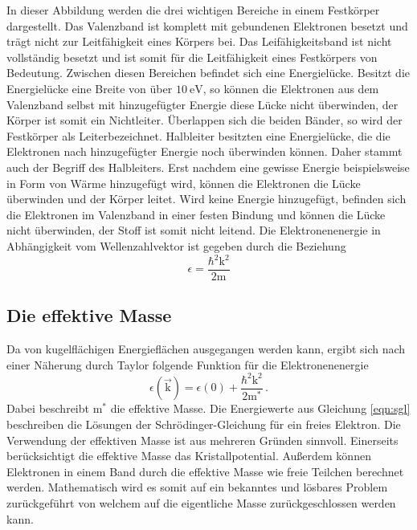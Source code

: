 In dieser Abbildung werden die drei wichtigen Bereiche in einem Festkörper
dargestellt. Das Valenzband ist komplett mit gebundenen
Elektronen besetzt und trägt nicht
zur Leitfähigkeit eines Körpers bei. Das Leifähigkeitsband ist nicht
vollständig besetzt und ist somit für die Leitfähigkeit eines Festkörpers von
Bedeutung. Zwischen diesen Bereichen befindet sich eine Energielücke. Besitzt
die Energielücke eine Breite von über $\SI{10}{\electronvolt}$, so können die
Elektronen aus dem Valenzband selbst mit hinzugefügter Energie diese Lücke nicht
überwinden, der Körper ist somit ein Nichtleiter. Überlappen sich die beiden
Bänder, so wird der Festkörper als Leiterbezeichnet. Halbleiter besitzten eine
Energielücke, die die Elektronen nach hinzugefügter Energie noch überwinden
können. Daher stammt auch der Begriff des Halbleiters. Erst nachdem eine
gewisse Energie beispielsweise in Form von Wärme hinzugefügt wird, können die
Elektronen die Lücke überwinden und der Körper leitet. Wird keine Energie
hinzugefügt, befinden sich die Elektronen im Valenzband in einer festen Bindung
und können die Lücke nicht überwinden, der Stoff ist somit nicht leitend. Die
Elektronenenergie in Abhängigkeit vom Wellenzahlvektor ist gegeben durch die
Beziehung
\begin{equation}
  \epsilon = \frac{\hbar^2 \text{k}^2}{2 \text{m}}
\end{equation}

\subsection{Die effektive Masse}
Da von kugelflächigen Energieflächen ausgegangen werden kann, ergibt sich nach
einer Näherung durch Taylor folgende Funktion für die Elektronenenergie
\begin{equation}
  \epsilon\left(\vec{\text{k}}\right) = \epsilon(0) + \frac{\hbar^2 \text{k}^2}
  {2 \text{m}^*} \, .
  \label{eqn:sgl}
\end{equation}
Dabei beschreibt $\text{m}^*$ die effektive Masse. Die Energiewerte aus
Gleichung \eqref{eqn:sgl} beschreiben die Lösungen der Schrödinger-Gleichung
für ein freies Elektron. Die Verwendung der effektiven Masse ist aus mehreren
Gründen sinnvoll. Einerseits berücksichtigt die effektive Masse das
Kristallpotential. Außerdem können Elektronen in einem Band durch die effektive
Masse wie freie Teilchen berechnet werden. Mathematisch wird es somit auf ein
bekanntes und lösbares Problem zurückgeführt von welchem auf die eigentliche
Masse zurückgeschlossen werden kann.

